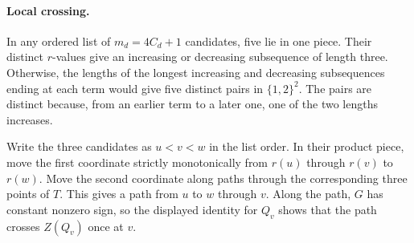 \documentclass[11pt,letterpaper]{article}
\begin{document}
\paragraph{Local crossing.}
In any ordered list of $m_d=4C_d+1$ candidates, five lie in one piece. Their distinct $r$-values give an increasing or decreasing subsequence of length three. Otherwise, the lengths of the longest increasing and decreasing subsequences ending at each term would give five distinct pairs in $\{1,2\}^2$. The pairs are distinct because, from an earlier term to a later one, one of the two lengths increases.

Write the three candidates as $u<v<w$ in the list order. In their product piece, move the first coordinate strictly monotonically from $r(u)$ through $r(v)$ to $r(w)$. Move the second coordinate along paths through the corresponding three points of $T$. This gives a path from $u$ to $w$ through $v$. Along the path, $G$ has constant nonzero sign, so the displayed identity for $Q_v$ shows that the path crosses $Z(Q_v)$ once at $v$.
\end{document}
